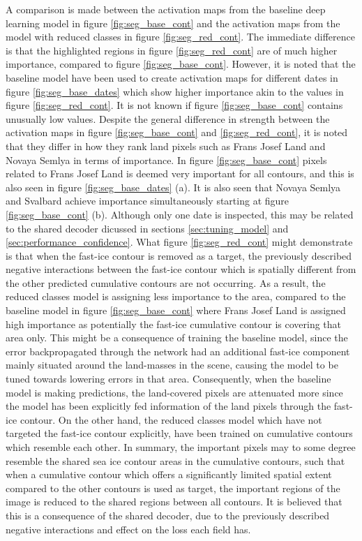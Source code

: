 \documentclass[../main/thesis]{subfiles}
\begin{document}
A comparison is made between the activation maps from the baseline deep learning model in figure \ref{fig:seg_base_cont} and the activation maps from the model with reduced classes in figure \ref{fig:seg_red_cont}. The immediate difference is that the highlighted regions in figure \ref{fig:seg_red_cont} are of much higher importance, compared to figure \ref{fig:seg_base_cont}. However, it is noted that the baseline model have been used to create activation maps for different dates in figure \ref{fig:seg_base_dates} which show higher importance akin to the values in figure \ref{fig:seg_red_cont}. It is not known if figure \ref{fig:seg_base_cont} contains unusually low values. Despite the general difference in strength between the activation maps in figure \ref{fig:seg_base_cont} and \ref{fig:seg_red_cont}, it is noted that they differ in how they rank land pixels such as Frans Josef Land and Novaya Semlya in terms of importance. In figure \ref{fig:seg_base_cont} pixels related to Frans Josef Land is deemed very important for all contours, and this is also seen in figure \ref{fig:seg_base_dates} (a). It is also seen that Novaya Semlya and Svalbard achieve importance simultaneously starting at figure \ref{fig:seg_base_cont} (b). Although only one date is inspected, this may be related to the shared decoder dicussed in sections \ref{sec:tuning_model} and \ref{sec:performance_confidence}. What figure \ref{fig:seg_red_cont} might demonstrate is that when the fast-ice contour is removed as a target, the previously described negative interactions between the fast-ice contour which is spatially different from the other predicted cumulative contours are not occurring. As a result, the reduced classes model is assigning less importance to the area, compared to the baseline model in figure \ref{fig:seg_base_cont} where Frans Josef Land is assigned high importance as potentially the fast-ice cumulative contour is covering that area only. This might be a consequence of training the baseline model, since the error backpropagated through the network had an additional fast-ice component mainly situated around the land-masses in the scene, causing the model to be tuned towards lowering errors in that area. Consequently, when the baseline model is making predictions, the land-covered pixels are attenuated more since the model has been explicitly fed information of the land pixels through the fast-ice contour. On the other hand, the reduced classes model which have not targeted the fast-ice contour explicitly, have been trained on cumulative contours which resemble each other. In summary, the important pixels may to some degree resemble the shared sea ice contour areas in the cumulative contours, such that when a cumulative contour which offers a significantly limited spatial extent compared to the other contours is used as target, the important regions of the image is reduced to the shared regions between all contours. It is believed that this is a consequence of the shared decoder, due to the previously described negative interactions and effect on the loss each field has.
\end{document}
